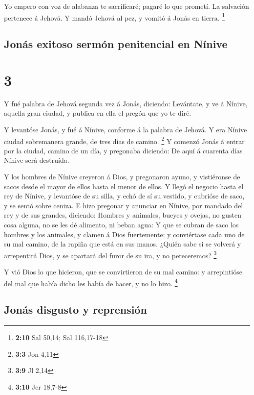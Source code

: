  Yo empero con voz de alabanza te sacrificaré; pagaré lo
que prometí. La salvación pertenece á Jehová. Y mandó Jehová al pez, y
vomitó á Jonás en tierra. \footnote{\textbf{2:10} Sal 50,14; Sal
  116,17-18}

\hypertarget{jonuxe1s-exitoso-sermuxf3n-penitencial-en-nuxednive}{%
\subsection{Jonás exitoso sermón penitencial en
Nínive}\label{jonuxe1s-exitoso-sermuxf3n-penitencial-en-nuxednive}}

\hypertarget{section-2}{%
\section{3}\label{section-2}}

 Y fué palabra de Jehová segunda vez á Jonás, diciendo:
 Levántate, y ve á Nínive, aquella gran ciudad, y publica
en ella el pregón que yo te diré.

 Y levantóse Jonás, y fué á Nínive, conforme á la palabra
de Jehová. Y era Nínive ciudad sobremanera grande, de tres días de
camino. \footnote{\textbf{3:3} Jon 4,11}  Y comenzó Jonás
á entrar por la ciudad, camino de un día, y pregonaba diciendo: De aquí
á cuarenta días Nínive será destruída.

 Y los hombres de Nínive creyeron á Dios, y pregonaron
ayuno, y vistiéronse de sacos desde el mayor de ellos hasta el menor de
ellos.  Y llegó el negocio hasta el rey de Nínive, y
levantóse de su silla, y echó de sí su vestido, y cubrióse de saco, y se
sentó sobre ceniza.  E hizo pregonar y anunciar en Nínive,
por mandado del rey y de sus grandes, diciendo: Hombres y animales,
bueyes y ovejas, no gusten cosa alguna, no se les dé alimento, ni beban
agua:  Y que se cubran de saco los hombres y los animales,
y clamen á Dios fuertemente: y conviértase cada uno de su mal camino, de
la rapiña que está en sus manos.  ¿Quién sabe si se
volverá y arrepentirá Dios, y se apartará del furor de su ira, y no
pereceremos? \footnote{\textbf{3:9} Jl 2,14}

 Y vió Dios lo que hicieron, que se convirtieron de su
mal camino: y arrepintióse del mal que había dicho les había de hacer, y
no lo hizo. \footnote{\textbf{3:10} Jer 18,7-8}

\hypertarget{jonuxe1s-disgusto-y-reprensiuxf3n}{%
\subsection{Jonás disgusto y
reprensión}\label{jonuxe1s-disgusto-y-reprensiuxf3n}}

